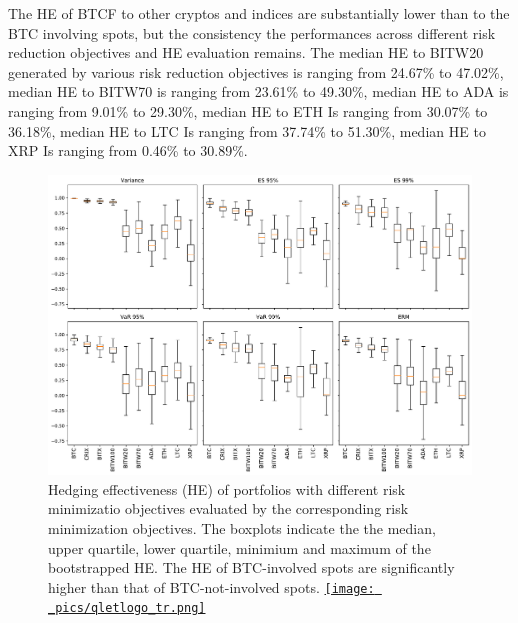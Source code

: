 The HE of BTCF to other cryptos and indices are substantially lower than to the BTC involving spots, but the consistency the performances across different risk reduction objectives and HE evaluation remains.
The median HE to BITW20 generated by various risk reduction objectives is ranging from 24.67\% to 47.02\%, median HE to BITW70 is ranging from 23.61\% to 49.30\%,
median HE to ADA is ranging from 9.01\% to 29.30\%, median HE to ETH Is ranging from 30.07\% to 36.18\%, median HE to LTC Is ranging from 37.74\% to 51.30\%,
median HE to XRP Is ranging from 0.46\% to 30.89\%.
\begin{figure}[h]
\includegraphics[width=\textwidth]{_pics/ES5_HE_boxplot.pdf}
  \caption{Hedging effectiveness (HE) of portfolios with different risk minimizatio objectives evaluated by the corresponding risk minimization objectives.
            The boxplots indicate the the median, upper quartile, lower quartile, minimium and maximum of the bootstrapped HE.
            The HE of BTC-involved spots are significantly higher than that of BTC-not-involved spots.
  \href{http://www.quantlet.com/}{\texttt{[image: \_pics/qletlogo\_tr.png]}} }
\label{fig:HEboxplot}
\end{figure}